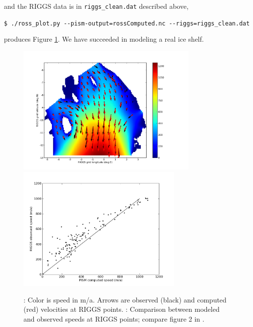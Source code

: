 \documentclass[11pt,final]{amsart}
\newcommand{\Matlab}{\textsc{Matlab}\xspace}
\begin{document}
\noindent and the RIGGS data is in \verb|riggs_clean.dat| described above,

\verb|$ ./ross_plot.py --pism-output=rossComputed.nc --riggs=riggs_clean.dat|

\noindent produces Figure \ref{fig:rosspython}.  We have succeeded in modeling a real ice shelf.









\begin{figure}[ht]
\mbox{\includegraphics[width=3.5in,keepaspectratio=true]{figs/rossquiver}\, \includegraphics[width=3.2in,keepaspectratio=true]{figs/rossscatter}}
\caption{: Color is speed in m/a.  Arrows are observed (black) and computed (red) velocities at RIGGS points.  : Comparison between modeled and observed speeds at RIGGS points; compare figure 2 in \cite{MacAyealetal}.}
\label{fig:rosspython}
\end{figure}
\end{document}
